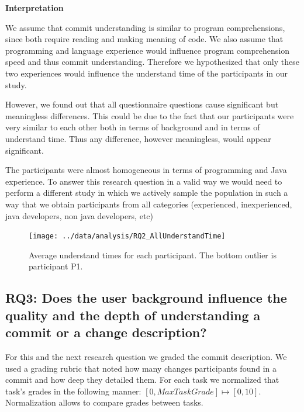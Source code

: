 \documentclass[letterpaper]{article}
\begin{document}
\textbf{Interpretation}

We assume that commit understanding is similar to program comprehensions, since both require reading and making meaning of code.
We also assume that programming and language experience would influence program comprehension speed and thus commit understanding.
Therefore we hypothesized that only these two experiences would influence the understand time of the participants in our study.

However, we found out that all questionnaire questions cause significant but meaningless differences.
This could be due to the fact that our participants were very similar to each  other both in terms of background and in terms of understand time.
Thus any difference, however meaningless, would appear significant.

The participants were almost homogeneous in terms of programming and Java experience.
To answer this research question in a valid way we would need to perform a different study in which we actively sample the population in such a way that we obtain participants from all categories (experienced, inexperienced, java developers, non java developers, etc)

\begin{figure}[H]
    \centering
    \texttt{[image: ../data/analysis/RQ2\_AllUnderstandTime]}
    \caption{Average understand times for each participant. The bottom outlier is participant P1.}
    \label{fig:rq2-understandTimes}
\end{figure}


\subsection{RQ3: Does the user background influence the quality and the depth of understanding a commit or a change description?}
\label{sec:RQ3}

For this and the next research question we graded the commit description.
We used a grading rubric that noted how many changes participants found in a commit and how deep they detailed them.
For each task we normalized that task's grades in the following manner: $ [0, MaxTaskGrade] \mapsto [0, 10]  $.
Normalization allows to compare grades between tasks.
\end{document}

